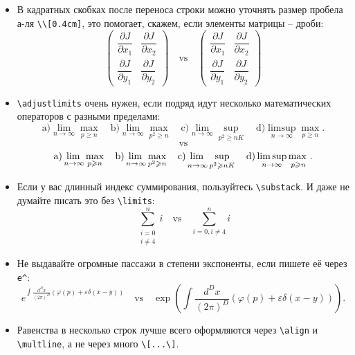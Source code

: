\begin{itemize}
\item В кадратных скобках после переноса строки можно уточнять размер пробела а-ля \lstinline{\\[0.4cm]}, это помогает, скажем, если элементы матрицы -- дроби:
\[
\begin{pmatrix}
\dfrac{\partial J}{\partial x_1} & \dfrac{\partial J}{\partial x_2}\\
\dfrac{\partial J}{\partial y_1} & \dfrac{\partial J}{\partial y_2}
\end{pmatrix}\quad \text{vs} \quad  \begin{pmatrix}
\dfrac{\partial J}{\partial x_1} & \dfrac{\partial J}{\partial x_2}\\[0.4cm]
\dfrac{\partial J}{\partial y_1} & \dfrac{\partial J}{\partial y_2}
\end{pmatrix}
\]
\item \verb+\adjustlimits+ очень нужен, если подряд идут несколько математических операторов с разными пределами:
\[\text{a)} \lim_{n\to\infty} \max_{p\geq n} \quad
\text{b)} \lim_{n\to\infty} \max_{p^2\geq n} \quad
\text{c)} \lim_{n\to\infty} \sup_{p^2\geq nK} \quad
\text{d)} \limsup_{n\to\infty} \max_{p\geq n}.
\]
\[
\text{vs}
\] 
\[
\text{a)} \adjustlimits\lim_{n\to\infty} \max_{p\geq n} \quad
\text{b)} \adjustlimits\lim_{n\to\infty} \max_{p^2\geq n} \quad
\text{c)} \adjustlimits\lim_{n\to\infty} \sup_{p^2\geq nK} \quad
\text{d)} \adjustlimits\limsup_{n\to\infty} \max_{p\geq n}.
\]
\item Если у вас длинный индекс суммирования, пользуйтесь \verb+\substack+. И даже не думайте писать это без \verb+\limits+:
\[
\sum_{\substack{i=0 \\ i\neq 4}}^n i \quad \text{vs} \quad \sum_{i=0, i\neq 4}^n i
\]
\item Не выдавайте огромные пассажи в степени экспоненты, если пишете её через \lstinline{e^}:
\[
e^{\int \frac{d^Dx}{(2\pi)^D} (\varphi(p) + \varepsilon \delta(x-y))} \quad \text{vs} \quad \exp\left(\int \frac{d^Dx}{(2\pi)^D} (\varphi(p) + \varepsilon \delta(x-y))\right).
\]
\item Равенства в несколько строк лучше всего оформляются через \verb+\align+ и \verb+\multline+, а не через много \verb+\[...\]+.
\end{itemize}



